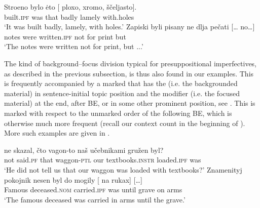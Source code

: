 \documentclass[output=paper,modfonts,newtxmath,hidelinks
\ChapterDOI{10.5281/zenodo.2545513}
]{langscibook}
\begin{document}
\ea\label{stroeno}
\ea\gll 	Stroeno bylo \.{e}to [\hspace{-2pt} ploxo, xromo, ščeljasto].\\
	built.\textsc{ipf} was that {} badly lamely with.holes\\
\glt	`It was built badly, lamely, with holes.' \label{stroenoa}
\ex\gll 	Zapiski byli pisany ne dlja pečati [{\dots} no\dots]\\	
	notes were written.\textsc{ipf} not for print {} but {}\\
\glt	`The notes were written not for print, but ...' \label{zapiski}
\z\z

\noindent The kind of background--focus division typical for presuppositional imperfectives, as described in the previous subsection, is thus also found in our examples. This  is frequently accompanied by a marked  that has the  (i.e. the backgrounded material) in sentence-initial topic position and the modifier (i.e. the focused material) at the end, after BE, or in some other prominent position, see . This  is marked with respect to the unmarked order of the  following BE, which is otherwise much more frequent (recall our context count in the beginning of ). More such examples are given in .

\ea\label{presOF-WO}
\ea\gll	[...] ne skazal, čto vagon-to naš učebnikami gružen byl?\\
	{} not said.\textsc{pf} that waggon-\textsc{ptl} our textbooks.\textsc{instr} loaded.\textsc{ipf} was\\
\glt	`He did not tell us that our waggon was loaded with textbooks?'\label{textbooks}
\ex\gll Znamenityj pokojnik nesen byl do mogily {\hspace{60pt}} [\hspace{-2pt} na rukax] [\dots] \label{nesen} \\
	Famous deceased.\textsc{nom} carried.\textsc{ipf} was until grave {} {} on arms\\
\glt	`The famous deceased was carried in arms until the grave.'
\z\z
\end{document}
